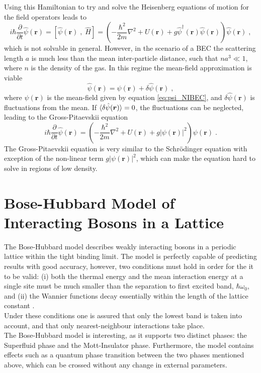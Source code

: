 Using this Hamiltonian to try and solve the Heisenberg equations of motion for the field operators leads to
\begin{equation}
	i \hbar \frac{\partial }{\partial t} \hat{\psi}(\boldsymbol{r}) = \left[ \hat{\psi}(\boldsymbol{r}) \; , \; \hat{H}  \right] = \left( - \frac{\hbar^2}{2 m} \nabla^2 + U(\boldsymbol{r}) + g \hat{\psi}^{\dag}(\boldsymbol{r}) \hat{\psi}(\boldsymbol{r}) \right) \hat{\psi}(\boldsymbol{r}) \; ,
\end{equation}
which is not solvable in general. However, in the scenario of a BEC the scattering length $a$ is much less than the mean inter-particle distance, such that $n a^3 \ll 1$, where $n$ is the density of the gas. In this regime the mean-field approximation is viable
\begin{equation}
	\hat{\psi}(\boldsymbol{r}) = \psi(\boldsymbol{r}) + \delta \hat{\psi}(\boldsymbol{r}) \; ,
\end{equation}
where $\psi(\boldsymbol{r})$ is the mean-field given by equation \eqref{eq:psi_NIBEC}, and $\delta \hat{\psi}(\boldsymbol{r})$ is fluctuations from the mean. If $\braket{\delta \hat{\psi}(\boldsymbol{r})} = 0$, the fluctuations can be neglected, leading to the Gross-Pitaevskii equation \cite{Gross1961,Pitaevskii}
\begin{equation}
	i \hbar \frac{\partial }{\partial t} \hat{\psi}(\boldsymbol{r}) = \left( - \frac{\hbar^2}{2 m} \nabla^2 + U(\boldsymbol{r}) + g |\psi(\boldsymbol{r})|^2 \right) \psi(\boldsymbol{r}) \; .
\end{equation}
The Gross-Pitaevskii equation is very similar to the Schrödinger equation with exception of the non-linear term $g |\psi(\boldsymbol{r})|^2$, which can make the equation hard to solve in regions of low density.



\section{Bose-Hubbard Model of Interacting Bosons in a Lattice} \label{sec:BHmodel}
The Bose-Hubbard model describes weakly interacting bosons in a periodic lattice within the tight binding limit. The model is perfectly capable of predicting results with good accuracy, however, two conditions must hold in order for the it to be valid: (i) both the thermal energy and the mean interaction energy at a single site must be much smaller than the separation to first excited band, $\hbar \omega_0$, and (ii) the Wannier functions decay essentially within the length of the lattice constant \cite{manybodyBloch}.\\
Under these conditions one is assured that only the lowest band is taken into account, and that only nearest-neighbour interactions take place.\\
The Bose-Hubbard model is interesting, as it supports two distinct phases: the Superfluid phase and the Mott-Insulator phase. Furthermore, the model contains effects such as a quantum phase transition between the two phases mentioned above, which can be crossed without any change in external parameters. 


